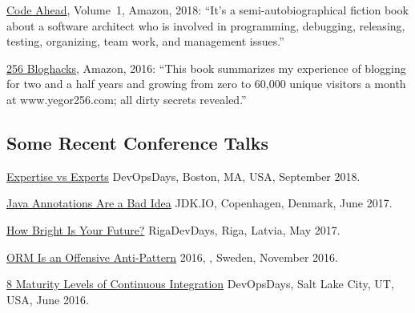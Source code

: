 \documentclass{yb}
\begin{document}
    \href{https://amzn.to/2u9BbqF}{Code Ahead}, Volume~1, Amazon, 2018:
    ``It's a semi-autobiographical fiction book about a software architect
    who is involved in programming, debugging, releasing, testing,
    organizing, team work, and management issues.''

    \href{https://amzn.to/2GkuyXf}{256 Bloghacks}, Amazon, 2016:
    ``This book summarizes my experience of blogging for two and a half years and growing from zero to 60,000
    unique visitors a month at www.yegor256.com; all dirty secrets revealed.''

    \subsection*{Some Recent Conference Talks}

    \begin{samepage}
        \href{https://youtu.be/KCx1o_lSMkI}{Expertise vs Experts}\newline
        DevOpsDays, Boston, MA, USA, September 2018.
    \end{samepage}

    \begin{samepage}
        \href{https://youtu.be/cv23Z6xpwDw}{Java Annotations Are a Bad Idea}\newline
        JDK.IO, Copenhagen, Denmark, June 2017.
    \end{samepage}

    \begin{samepage}
        \href{https://www.youtube.com/watch?v=IGbteQpTNCA}{How Bright Is Your Future?}\newline
        RigaDevDays, Riga, Latvia, May 2017.
    \end{samepage}

    \begin{samepage}
        \href{https://www.youtube.com/watch?v=03PXmPc7Q3g}{ORM Is an Offensive Anti-Pattern}\newline
         2016, , Sweden, November 2016.
    \end{samepage}

    \begin{samepage}
        \href{https://www.youtube.com/watch?v=3dJP_LtUGgg}{8 Maturity Levels of Continuous Integration}\newline
        DevOpsDays, Salt Lake City, UT, USA, June 2016.
    \end{samepage}
\end{document}
